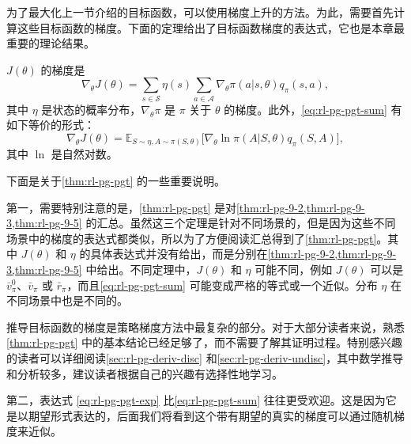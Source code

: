 为了最大化上一节介绍的目标函数，可以使用梯度上升的方法。为此，需要首先计算这些目标函数的梯度。下面的定理给出了目标函数梯度的表达式，它也是本章最重要的理论结果。

\begin{theorem}[策略梯度定理]
\label{thm:rl-pg-pgt}
$J(\theta)$ 的梯度是
\begin{equation}
\nabla_{\theta} J(\theta) = \sum_{s \in \mathcal{S}} \eta(s) \sum_{a \in \mathcal{A}} \nabla_{\theta} \pi(a|s,\theta) q_{\pi}(s,a),
\label{eq:rl-pg-pgt-sum}
\end{equation}
其中 $\eta$ 是状态的概率分布，$\nabla_{\theta} \pi$ 是 $\pi$ 关于 $\theta$ 的梯度。此外，\cref{eq:rl-pg-pgt-sum} 有如下等价的形式：
\begin{equation}
\nabla_{\theta} J(\theta) = \mathbb{E}_{S \sim \eta, A \sim \pi(S,\theta)} \Big[ \nabla_{\theta} \ln \pi(A|S,\theta) q_{\pi}(S,A) \Big],
\label{eq:rl-pg-pgt-exp}
\end{equation}
其中 $\ln$ 是自然对数。
\end{theorem}

下面是关于\cref{thm:rl-pg-pgt} 的一些重要说明。

第一，需要特别注意的是，\cref{thm:rl-pg-pgt} 是对\cref{thm:rl-pg-9-2,thm:rl-pg-9-3,thm:rl-pg-9-5} 的汇总。虽然这三个定理是针对不同场景的，但是因为这些不同场景中的梯度的表达式都类似，所以为了方便阅读汇总得到了\cref{thm:rl-pg-pgt}。其中 $J(\theta)$ 和 $\eta$ 的具体表达式并没有给出，而是分别在\cref{thm:rl-pg-9-2,thm:rl-pg-9-3,thm:rl-pg-9-5} 中给出。不同定理中，$J(\theta)$ 和 $\eta$ 可能不同，例如 $J(\theta)$ 可以是 $\bar{v}_{\pi}^{0}$、$\bar{v}_{\pi}$ 或 $\bar{r}_{\pi}$，而且\cref{eq:rl-pg-pgt-sum} 可能变成严格的等式或一个近似。分布 $\eta$ 在不同场景中也是不同的。

推导目标函数的梯度是策略梯度方法中最复杂的部分。对于大部分读者来说，熟悉\cref{thm:rl-pg-pgt} 中的基本结论已经足够了，而不需要了解其证明过程。特别感兴趣的读者可以详细阅读\cref{sec:rl-pg-deriv-disc} 和\cref{sec:rl-pg-deriv-undisc}，其中数学推导和分析较多，建议读者根据自己的兴趣有选择性地学习。

第二，表达式 \eqref{eq:rl-pg-pgt-exp} 比\cref{eq:rl-pg-pgt-sum} 往往更受欢迎。这是因为它是以期望形式表达的，后面我们将看到这个带有期望的真实的梯度可以通过随机梯度来近似。

